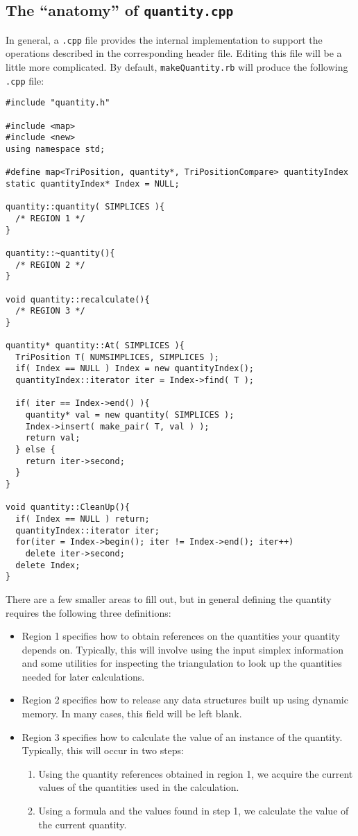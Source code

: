\documentclass[10pt]{article}%
\begin{document}
\subsection{The ``anatomy'' of \texttt{quantity.cpp}}

In general, a \texttt{.cpp} file provides the internal implementation to support the operations described in the corresponding header file. Editing this file will be a little more complicated. By default, \texttt{makeQuantity.rb} will produce the following \texttt{.cpp} file: 
{\small{\begin{verbatim} 
#include "quantity.h"

#include <map>
#include <new>
using namespace std;

#define map<TriPosition, quantity*, TriPositionCompare> quantityIndex 
static quantityIndex* Index = NULL;

quantity::quantity( SIMPLICES ){
  /* REGION 1 */
}

quantity::~quantity(){
  /* REGION 2 */
}

void quantity::recalculate(){
  /* REGION 3 */
}

quantity* quantity::At( SIMPLICES ){
  TriPosition T( NUMSIMPLICES, SIMPLICES );
  if( Index == NULL ) Index = new quantityIndex();
  quantityIndex::iterator iter = Index->find( T );

  if( iter == Index->end() ){
    quantity* val = new quantity( SIMPLICES );
    Index->insert( make_pair( T, val ) );
    return val;
  } else {
    return iter->second;
  }
}

void quantity::CleanUp(){
  if( Index == NULL ) return;
  quantityIndex::iterator iter;
  for(iter = Index->begin(); iter != Index->end(); iter++)
    delete iter->second;
  delete Index;
}
\end{verbatim}
}}
There are a few smaller areas to fill out, but in general defining the quantity requires the following three definitions:
\begin{itemize}
\item  Region 1 specifies how to obtain references on the quantities your quantity depends on. Typically, this will involve using the input simplex information and some utilities for inspecting the triangulation to look up the quantities needed for later calculations.
\item  Region 2 specifies how to release any data structures built up using dynamic memory. In many cases, this field will be left blank.
\item  Region 3 specifies how to calculate the value of an instance of the quantity. Typically, this will occur in two steps:
\begin{enumerate}
\item  Using the quantity references obtained in region 1, we acquire the current values of the quantities used in the calculation.
\item  Using a formula and the values found in step 1, we calculate the value of the current quantity.
\end{enumerate}
\end{itemize}
\end{document}
